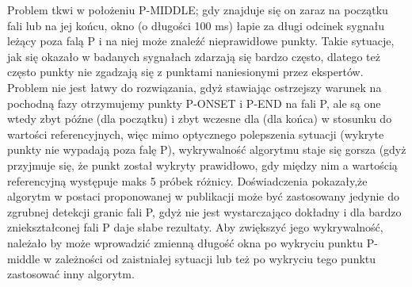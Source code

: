 Problem tkwi w położeniu P-MIDDLE; gdy znajduje się on zaraz na początku fali lub na jej końcu, okno (o długości 100 ms) łapie za długi odcinek sygnału leżący poza falą P i na niej może znaleźć nieprawidłowe punkty. Takie sytuacje, jak się okazało w badanych sygnałach zdarzają się bardzo często, dlatego też często punkty nie zgadzają się z punktami naniesionymi przez ekspertów. Problem nie jest łatwy do rozwiązania, gdyż stawiając ostrzejszy warunek na pochodną fazy otrzymujemy punkty P-ONSET i P-END na fali P, ale są one wtedy zbyt późne (dla początku) i zbyt wczesne dla (dla końca) w stosunku do wartości referencyjnych, więc mimo optycznego polepszenia sytuacji (wykryte punkty nie wypadają poza falę P), wykrywalność algorytmu staje się gorsza (gdyż przyjmuje się, że punkt został wykryty prawidłowo, gdy między nim a wartością referencyjną występuje maks 5 próbek różnicy. 
Doświadczenia pokazały,że algorytm w postaci proponowanej w publikacji \cite{Waves_aNMfADoEFPBotPT} może być zastosowany jedynie do zgrubnej detekcji granic fali P, gdyż nie jest wystarczająco dokładny i dla bardzo zniekształconej fali P daje słabe rezultaty. Aby zwiększyć jego wykrywalność, należało by może  wprowadzić zmienną długość okna po wykryciu punktu P-middle w zależności od zaistniałej sytuacji  lub też po wykryciu tego punktu zastosować inny algorytm.